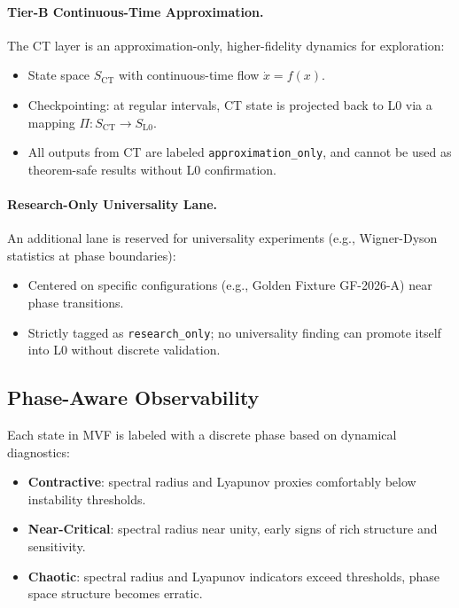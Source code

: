 \documentclass[11pt]{article}
\begin{document}
\paragraph{Tier-B Continuous-Time Approximation.}
The CT layer is an approximation-only, higher-fidelity dynamics for exploration:

\begin{itemize}[itemsep=2pt]
  \item State space \(S_{\mathrm{CT}}\) with continuous-time flow \(\dot{x} = f(x)\).
  \item Checkpointing: at regular intervals, CT state is projected back to L0 via a mapping \(\Pi\colon S_{\mathrm{CT}} \to S_{\mathrm{L0}}\).
  \item All outputs from CT are labeled \texttt{approximation\_only}, and cannot be used as theorem-safe results without L0 confirmation.
\end{itemize}

\paragraph{Research-Only Universality Lane.}
An additional lane is reserved for universality experiments (e.g., Wigner-Dyson statistics at phase boundaries):

\begin{itemize}[itemsep=2pt]
  \item Centered on specific configurations (e.g., Golden Fixture GF-2026-A) near phase transitions.
  \item Strictly tagged as \texttt{research\_only}; no universality finding can promote itself into L0 without discrete validation.
\end{itemize}

\subsection{Phase-Aware Observability}

Each state in MVF is labeled with a discrete phase based on dynamical diagnostics:

\begin{itemize}[itemsep=2pt]
  \item \textbf{Contractive}: spectral radius and Lyapunov proxies comfortably below instability thresholds.
  \item \textbf{Near-Critical}: spectral radius near unity, early signs of rich structure and sensitivity.
  \item \textbf{Chaotic}: spectral radius and Lyapunov indicators exceed thresholds, phase space structure becomes erratic.
\end{itemize}
\end{document}
